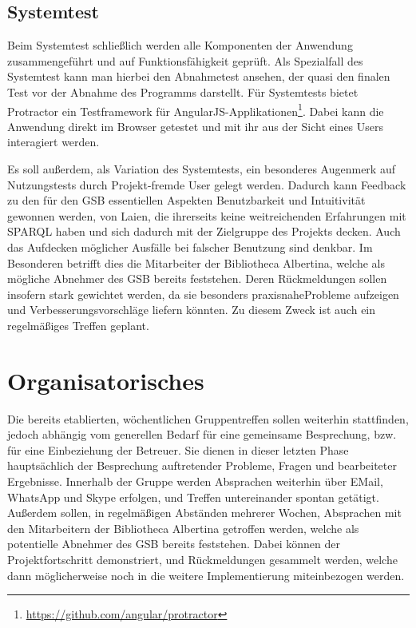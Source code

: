 \subsection*{Systemtest}
Beim Systemtest schließlich werden alle Komponenten der Anwendung zusammengeführt und auf Funktionsfähigkeit geprüft. Als Spezialfall des Systemtest kann man hierbei den Abnahmetest ansehen, der quasi den finalen Test vor der Abnahme des Programms darstellt.
Für Systemtests bietet Protractor ein Testframework für AngularJS-Applikationen\footnote{\url{https://github.com/angular/protractor} }. Dabei kann die Anwendung direkt im Browser getestet und mit ihr aus der Sicht eines Users interagiert werden.%

Es soll außerdem, als Variation des Systemtests, ein besonderes Augenmerk auf Nutzungstests durch Projekt-fremde User gelegt werden. Dadurch kann Feedback zu den für den GSB essentiellen Aspekten Benutzbarkeit und Intuitivität gewonnen werden, von Laien, die ihrerseits keine weitreichenden Erfahrungen mit SPARQL haben und sich dadurch mit der Zielgruppe des Projekts decken. Auch das Aufdecken möglicher Ausfälle bei falscher Benutzung sind denkbar.
Im Besonderen betrifft dies die Mitarbeiter der Bibliotheca Albertina, welche als mögliche Abnehmer des GSB bereits feststehen. Deren Rückmeldungen sollen insofern stark gewichtet werden, da sie besonders \glqq praxisnahe\grqq Probleme aufzeigen und Verbesserungsvorschläge liefern könnten. Zu diesem Zweck ist auch ein regelmäßiges Treffen geplant.

\section{Organisatorisches}

Die bereits etablierten, wöchentlichen Gruppentreffen sollen weiterhin stattfinden, jedoch abhängig vom generellen Bedarf für eine gemeinsame Besprechung, bzw. für eine Einbeziehung der Betreuer. Sie dienen in dieser letzten Phase hauptsächlich der Besprechung auftretender Probleme, Fragen und bearbeiteter Ergebnisse. Innerhalb der Gruppe werden Absprachen weiterhin über EMail, WhatsApp und Skype erfolgen, und Treffen untereinander spontan getätigt.
Außerdem sollen, in regelmäßigen Abständen mehrerer Wochen, Absprachen mit den Mitarbeitern der Bibliotheca Albertina getroffen werden, welche als potentielle Abnehmer des GSB bereits feststehen. Dabei können der Projektfortschritt demonstriert, und Rückmeldungen gesammelt werden, welche dann möglicherweise noch in die weitere Implementierung miteinbezogen werden.

